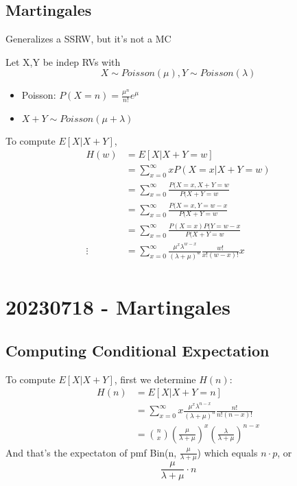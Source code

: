 \documentclass{report}
\begin{document}
    \section{Martingales}%
    Generalizes a SSRW, but it's not a MC
     {
      Let X,Y be indep RVs with
      \[ X \sim Poisson(\mu), Y \sim Poisson(\lambda) \]
      \begin{itemize}
        \item Poisson: $P(X=n) = \frac{\mu^n}{n!} e^{\mu}$
        \item $X + Y \sim Poisson(\mu + \lambda)$
      \end{itemize}
      To compute $E[X|X+Y]$,
            \begin{align}
              H(w) &= E[X|X+Y=w] \\
                  &= \sum^{\infty}_{x=0} x P(X=x| X+Y=w)  \\
                  &= \sum^{\infty}_{x=0} \frac{P(X=x, X+Y=w}{P(X+Y=w}  \\
                  &= \sum^{\infty}_{x=0} \frac{P(X=x, Y=w-x}{P(X+Y=w}  \\
                  &= \sum^{\infty}_{x=0} \frac{P(X=x) P(Y=w-x}{P(X+Y=w}  \\
                  \vdots
                  &= \sum^{\infty}_{x=0} \frac{\mu^x \lambda^{w-x}}{(\lambda + \mu)^w} \frac{w!}{x!(w-x)!} x   \\
            \end{align}
    }
    
\chapter{20230718 - Martingales}%
   \section{Computing Conditional Expectation}%
   To compute $E[X|X+Y]$, first we determine $H(n)$:
            \begin{align*}
              H(n) &= E[X|X+Y=n] \\
                  &= \sum^{\infty}_{x=0} x\frac{\mu^x \lambda^{n-x}}{(\lambda + \mu)^n} \frac{n!}{n!(n-x)!} \\
                  &= \binom{n}{x} \left( \frac{\mu}{\lambda + \mu} \right)^x \left( \frac{\lambda}{\lambda + \mu} \right)^{n-x}
            \end{align*}
            And that's the expectaton of pmf Bin(n, $\frac{\mu}{\lambda + \mu}$) which equals $n \cdot p$, or
            \[ \frac{\mu}{\lambda + \mu} \cdot n \]
\end{document}
